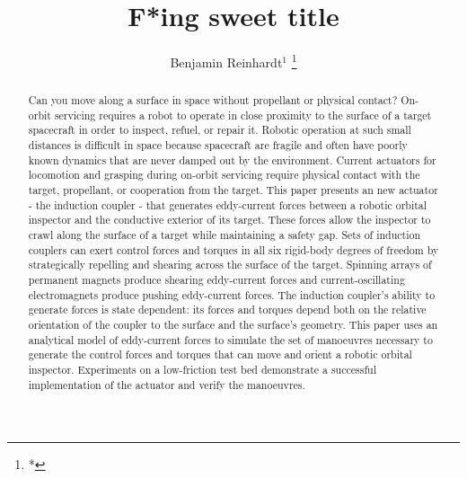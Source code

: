 \documentclass[letterpaper, 10 pt, conference]{ieeeconf}  %
\title{\LARGE \bf
F*ing sweet title
}
\author{Benjamin Reinhardt$^{1}$ %
\thanks{*}%
}
\begin{document}
\maketitle
\thispagestyle{empty}
\pagestyle{empty}


\begin{abstract}

Can you move along a surface in space without propellant or physical contact? On-orbit servicing requires a robot to operate in close proximity to the surface of a target spacecraft in order to inspect, refuel, or repair it.  Robotic operation at such small distances is difficult in space because spacecraft are fragile and often have poorly known dynamics that are never damped out by the environment. Current actuators for locomotion and grasping during on-orbit servicing require physical contact with the target, propellant, or cooperation from the target.  
%
This paper presents an new actuator - the induction coupler - that generates eddy-current forces between a robotic orbital inspector and the conductive exterior of its target. These forces allow the inspector to crawl along the surface of a target while maintaining a safety gap. Sets of induction couplers can exert control forces and torques in all six rigid-body degrees of freedom by strategically repelling and shearing across the surface of the target. Spinning arrays of permanent magnets produce shearing eddy-current forces and current-oscillating electromagnets produce pushing eddy-current forces. 
%
The induction coupler's ability to generate forces is state dependent: its forces and torques depend both on the relative orientation of the coupler to the surface and the surface's geometry. This paper uses an analytical model of eddy-current forces to simulate the set of manoeuvres necessary to generate the control forces and torques that can move and orient a robotic orbital inspector. Experiments on a low-friction test bed demonstrate a successful implementation of the actuator and verify the manoeuvres.

\end{abstract}


\listoftodos
{}
\end{document}

